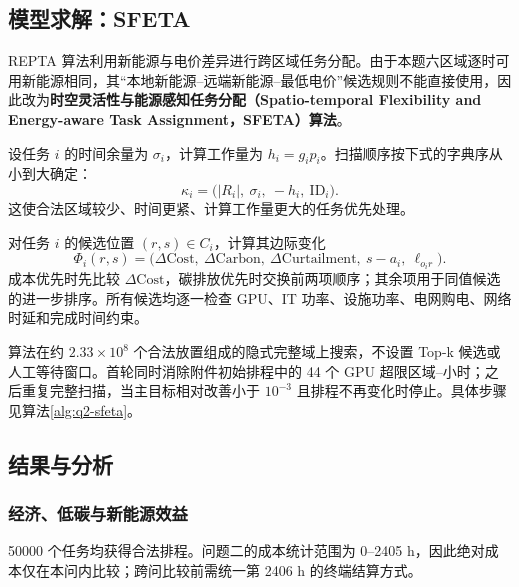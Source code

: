 \subsection{模型求解：SFETA}

REPTA 算法利用新能源与电价差异进行跨区域任务分配\cite{yang_repta_2026}。由于本题六区域逐时可用新能源相同，其“本地新能源--远端新能源--最低电价”候选规则不能直接使用，因此改为\textbf{时空灵活性与能源感知任务分配（Spatio-temporal Flexibility and Energy-aware Task Assignment，SFETA）算法}。

设任务 $i$ 的时间余量为 $\sigma_i$，计算工作量为 $h_i=g_ip_i$。扫描顺序按下式的字典序从小到大确定：
\begin{equation}
\kappa_i=\bigl(|R_i|,\ \sigma_i,\ -h_i,\ \mathrm{ID}_i\bigr).
\label{eq:q2-scan-key}
\end{equation}
这使合法区域较少、时间更紧、计算工作量更大的任务优先处理。

对任务 $i$ 的候选位置 $(r,s)\in C_i$，计算其边际变化
\begin{equation}
\Phi_i(r,s)=\bigl(\Delta\mathrm{Cost},\ \Delta\mathrm{Carbon},\ \Delta\mathrm{Curtailment},\ s-a_i,\ \ell_{o_ir}\bigr).
\label{eq:q2-candidate-score}
\end{equation}
成本优先时先比较 $\Delta\mathrm{Cost}$，碳排放优先时交换前两项顺序；其余项用于同值候选的进一步排序。所有候选均逐一检查 GPU、IT 功率、设施功率、电网购电、网络时延和完成时间约束。

算法在约 $2.33\times10^8$ 个合法放置组成的隐式完整域上搜索，不设置 Top-k 候选或人工等待窗口。首轮同时消除附件初始排程中的 44 个 GPU 超限区域--小时；之后重复完整扫描，当主目标相对改善小于 $10^{-3}$ 且排程不再变化时停止。具体步骤见算法\ref{alg:q2-sfeta}。



\subsection{结果与分析}

\subsubsection{经济、低碳与新能源效益}

50000 个任务均获得合法排程。问题二的成本统计范围为 0--2405 h，因此绝对成本仅在本问内比较；跨问比较前需统一第 2406 h 的终端结算方式。

